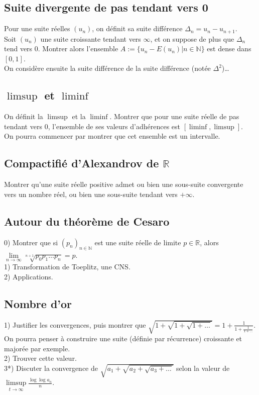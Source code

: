 \documentclass{article}
\begin{document}
\subsection{Suite divergente de pas tendant vers 0}
Pour une suite r\'eelles $(u_n)$, on d\'efinit sa suite diff\'erence $\Delta_n=u_n-u_{n+1}$.\\
Soit $(u_n)$ une suite croissante tendant vers $\infty$, et on suppose de plus que $\Delta_n$ tend vers 0. Montrer alors l'ensemble $A:=\{u_n-E(u_n)|n\in\mathbb{N}\}$ est dense dans $[0,1]$.\\
On consid\`ere ensuite la suite diff\'erence de la suite diff\'erence (not\'ee $\Delta^2$)\dots

\subsection{$\limsup$ et $\liminf$}
On d\'efinit la $\limsup$ et la $\liminf$. Montrer que pour une suite r\'eelle de pas tendant vers $0$, l'ensemble de ses valeurs d'adh\'erences est $[\liminf, \limsup]$.\\
On pourra commencer par montrer que cet ensemble est un intervalle.

\subsection{Compactifi\'e d'Alexandrov de $\mathbb{R}$}
Montrer qu'une suite r\'eelle positive admet ou bien une sous-suite convergente vers un nombre r\'eel, ou bien une sous-suite tendant vers $+\infty$.

\subsection{Autour du th\'eor\`eme de Cesaro}
0) Montrer que si $(p_n)_{n\in\mathbb{N}}$ est une suite r\'eelle de limite $p\in\mathbb{R}$, alors $\lim\limits_{n\to\infty}\sqrt[n+1]{p_0p_1\dots p_n}=p$.\\
1) Transformation de Toeplitz, une CNS.\\
2) Applications.

\subsection{Nombre d'or}
1) Justifier les convergences, puis montrer que $\sqrt{1+\sqrt{1+\sqrt{1+\dots}}}=1+\frac{1}{1+\frac{1}{1+\dots}}$. On pourra penser \`a construire une suite (d\'efinie par r\'ecurrence) croissante et major\'ee par exemple.\\
2) Trouver cette valeur.\\
3*) Discuter la convergence de $\sqrt{a_1+\sqrt{a_2+\sqrt{a_3+\dots}}}$ selon la valeur de $\limsup\limits_{t\to\infty}\frac{\log\log a_n}{n}$.
\end{document}
